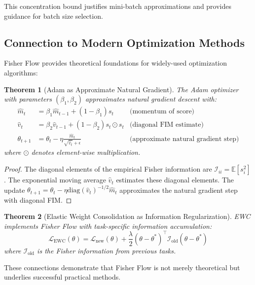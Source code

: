 \documentclass[11pt]{article}
\newtheorem{theorem}{Theorem}
\begin{document}
This concentration bound justifies mini-batch approximations and provides guidance for batch size selection.

\subsection{Connection to Modern Optimization Methods}

Fisher Flow provides theoretical foundations for widely-used optimization algorithms:

\begin{theorem}[Adam as Approximate Natural Gradient]
\label{thm:adam_natural}
The Adam optimizer \cite{kingma2014adam} with parameters $(\beta_1, \beta_2)$ approximates natural gradient descent with:
\begin{align}
\hat{m}_t &= \beta_1 \hat{m}_{t-1} + (1-\beta_1) s_t & \text{(momentum of score)}\\
\hat{v}_t &= \beta_2 \hat{v}_{t-1} + (1-\beta_2) s_t \odot s_t & \text{(diagonal FIM estimate)}\\
\theta_{t+1} &= \theta_t - \eta \frac{\hat{m}_t}{\sqrt{\hat{v}_t} + \epsilon} & \text{(approximate natural gradient step)}
\end{align}
where $\odot$ denotes element-wise multiplication.
\end{theorem}

\begin{proof}
The diagonal elements of the empirical Fisher information are $\mathcal{I}_{ii} = \mathbb{E}[s_i^2]$. The exponential moving average $\hat{v}_t$ estimates these diagonal elements. The update $\theta_{t+1} = \theta_t - \eta \text{diag}(\hat{v}_t)^{-1/2} \hat{m}_t$ approximates the natural gradient step with diagonal FIM.
\end{proof}

\begin{theorem}[Elastic Weight Consolidation as Information Regularization]
EWC \cite{kirkpatrick2017overcoming} implements Fisher Flow with task-specific information accumulation:
\begin{equation}
\mathcal{L}_{\text{EWC}}(\theta) = \mathcal{L}_{\text{new}}(\theta) + \frac{\lambda}{2}(\theta - \theta^*)^\top \mathcal{I}_{\text{old}} (\theta - \theta^*)
\end{equation}
where $\mathcal{I}_{\text{old}}$ is the Fisher information from previous tasks.
\end{theorem}

These connections demonstrate that Fisher Flow is not merely theoretical but underlies successful practical methods.
\end{document}

